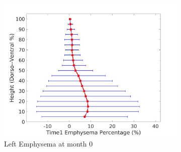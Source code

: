 \begin{figure}[H]
\begin{subfigure}{.42\linewidth}
  \includegraphics[width=\linewidth,trim={{.0\wd0} {.0\wd0} {.0\wd0} {.0\wd0}},clip]{QuantitativeAnalysis/Image/LeftLungEmphysemaDiseaseDorsoToVentralTime1.jpg} %
  \caption{Left Emphysema at month 0}
  \label{fig:DiseaseDorsoToVentralTime1-g} 
\end{subfigure} 
\begin{subfigure}{.42\linewidth}%

\end{subfigure}
\end{figure}

